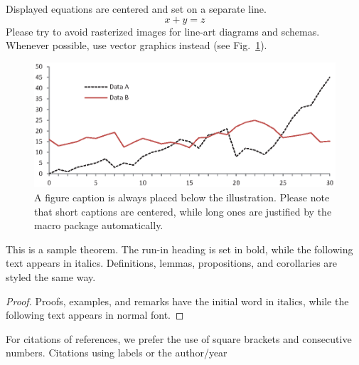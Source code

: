\documentclass[runningheads]{llncs}
\begin{document}
\noindent Displayed equations are centered and set on a separate
line.
\begin{equation}
x + y = z
\end{equation}
Please try to avoid rasterized images for line-art diagrams and
schemas. Whenever possible, use vector graphics instead (see
Fig.~\ref{fig1}).

\begin{figure}
\includegraphics[width=\textwidth]{fig1.eps}
\caption{A figure caption is always placed below the illustration.
Please note that short captions are centered, while long ones are
justified by the macro package automatically.} \label{fig1}
\end{figure}

\begin{theorem}
This is a sample theorem. The run-in heading is set in bold, while
the following text appears in italics. Definitions, lemmas,
propositions, and corollaries are styled the same way.
\end{theorem}
%
%
\begin{proof}
Proofs, examples, and remarks have the initial word in italics,
while the following text appears in normal font.
\end{proof}
For citations of references, we prefer the use of square brackets
and consecutive numbers. Citations using labels or the author/year


\end{document}
